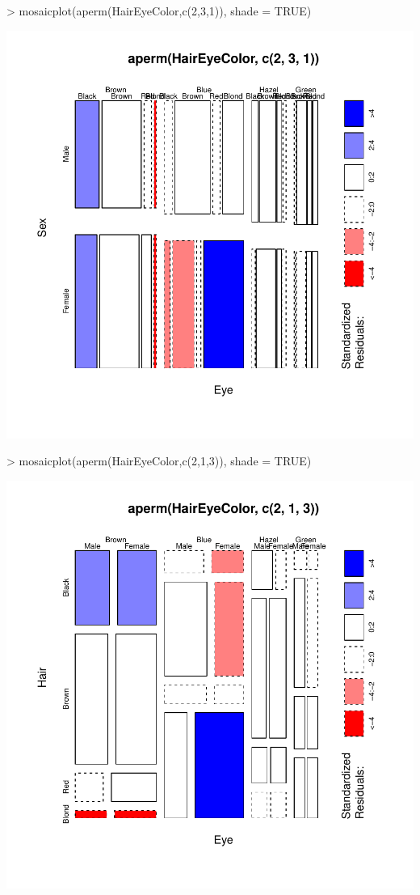 \documentclass[12pt,letterpaper,final]{article}
\begin{document}
\begin{enumerate}
\begin{enumerate}
{\newpage
\begin{Schunk}
\begin{Sinput}
> mosaicplot(aperm(HairEyeColor,c(2,3,1)), shade = TRUE)
\end{Sinput}
\end{Schunk}
\includegraphics{hw02_bartschi-012}
\newpage
\begin{Schunk}
\begin{Sinput}
> mosaicplot(aperm(HairEyeColor,c(2,1,3)), shade = TRUE)
\end{Sinput}
\end{Schunk}
\includegraphics{hw02_bartschi-013}
}
\end{enumerate}
\end{enumerate}
\end{document}
